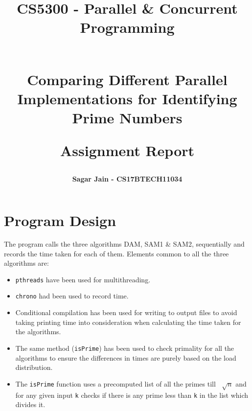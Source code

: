 \documentclass[a4paper,12pt]{report}
\begin{document}
\title{
\textbf{CS5300 - Parallel \& Concurrent Programming}\\~\\
\begin{large}
\textbf{Comparing Different Parallel Implementations for Identifying Prime Numbers}\\
\end{large}
\begin{large}
\textbf{Assignment Report}
\end{large}
}
\author{\textbf{Sagar Jain - CS17BTECH11034}\\}
\maketitle
\begin{large}
\tableofcontents
\end{large}
\newpage
\section{Program Design}
The program calls the three algorithms DAM, SAM1 \& SAM2, sequentially and records the time taken for each of them. Elements common to all the three algorithms are:
\begin{itemize}
\item \texttt{pthreads} have been used for multithreading.
\item \texttt{chrono} had been used to record time.
\item Conditional compilation has been used for writing to output files to avoid taking printing time into consideration when calculating the time taken for the algorithms.
\item The same method (\texttt{isPrime}) has been used to check primality for all the algorithms to ensure the differences in times are purely based on the load distribution.
\item The \texttt{isPrime} function uses a precomputed list of all the primes till $\;\sqrt[]{n}$ and for any given input \texttt{k} checks if there is any prime less than \texttt{k} in the list which divides it.
\end{itemize}
\end{document}
